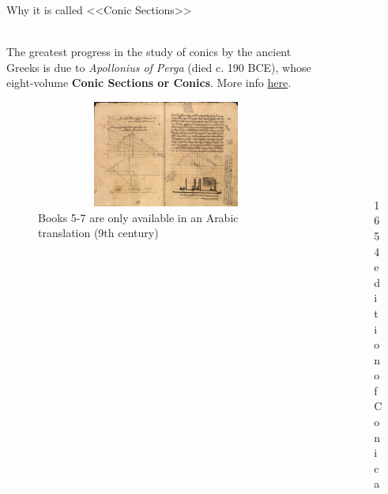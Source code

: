 \documentclass[aspectratio=169,notes]{beamer}
\begin{document}
\begin{frame}[t]{Why it is called <<Conic Sections>>}
\framesubtitle{}
    \begin{columns}[T,onlytextwidth]
        \begin{column}{0.69\textwidth}
            The greatest progress in the study of conics by the ancient Greeks is due to \textit{Apollonius of Perga} (died c. 190 BCE), whose eight-volume \textbf{Conic Sections or Conics}. More info \href{https://en.wikipedia.org/wiki/Conic_section}{here}.
            \begin{figure}[H]
                \centering\includegraphics[height=3.5cm,width=1\textwidth,keepaspectratio]{conica_book.png}
                \caption*{Books 5-7 are only available in an Arabic translation (9th century)}
                \label{fig:conica_book.png}
            \end{figure}
        \end{column}
        \begin{column}{0.29\textwidth}
            \vspace{-0.5cm}
            \begin{figure}[H]
                \centering\includegraphics[height=5cm,width=1\textwidth,keepaspectratio]{apollonius_book.jpg}
                \caption*{1654 edition of Conica}
                \label{fig:apollonius_book.jpg}
            \end{figure}
        \end{column}
    \end{columns}
\end{frame}
\end{document}

